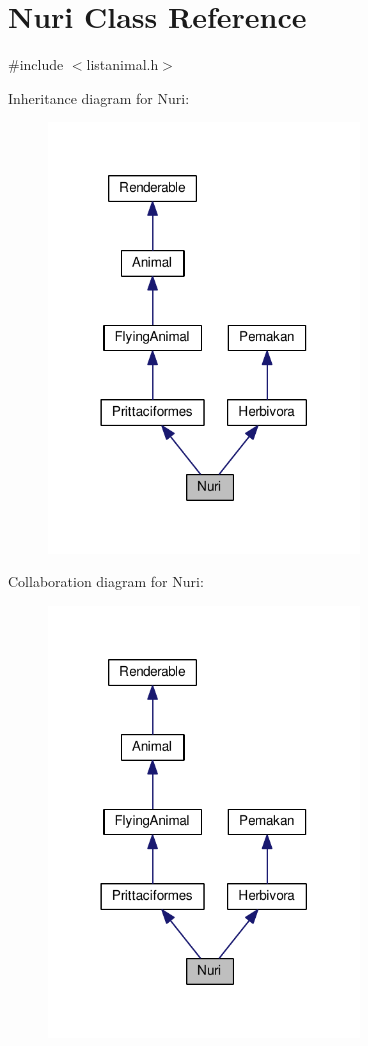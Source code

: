 \hypertarget{classNuri}{}\section{Nuri Class Reference}
\label{classNuri}


{\ttfamily \#include $<$listanimal.\+h$>$}



Inheritance diagram for Nuri\+:
\nopagebreak
\begin{figure}[H]
\begin{center}
\leavevmode
\includegraphics[width=234pt]{classNuri__inherit__graph}
\end{center}
\end{figure}


Collaboration diagram for Nuri\+:
\nopagebreak
\begin{figure}[H]
\begin{center}
\leavevmode
\includegraphics[width=234pt]{classNuri__coll__graph}
\end{center}
\end{figure}
